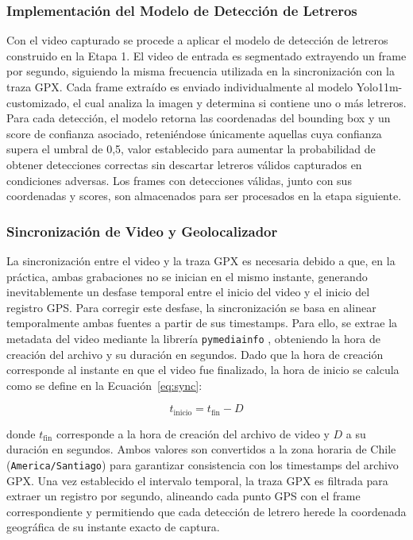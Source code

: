 \documentclass[runningheads]{llncs}
\begin{document}
\subsubsection{Implementación del Modelo de Detección de Letreros}
Con el video capturado se procede a 
aplicar el modelo de detección de letreros construido en la Etapa 1. El 
video de entrada es segmentado extrayendo un frame por segundo, siguiendo la 
misma frecuencia utilizada en la sincronización con la traza GPX. Cada 
frame extraído es enviado individualmente al modelo Yolo11m-customizado, 
el cual analiza la imagen y determina si contiene uno o más letreros. 
Para cada detección, el modelo retorna las coordenadas del bounding box y un score de confianza asociado,
reteniéndose únicamente aquellas cuya confianza supera el umbral de 0{,}5, valor establecido para aumentar la 
probabilidad de obtener detecciones correctas sin descartar letreros válidos capturados en condiciones adversas. 
Los frames con detecciones válidas, junto con sus coordenadas y scores, son 
almacenados para ser procesados en la etapa siguiente.

\subsubsection{Sincronización de Video y Geolocalizador}
La sincronización entre el video y la traza GPX es necesaria debido a 
que, en la práctica, ambas grabaciones no se inician en el mismo 
instante, generando inevitablemente un desfase temporal entre 
el inicio del video y el inicio del registro GPS. Para corregir este 
desfase, la sincronización se basa en alinear temporalmente ambas 
fuentes a partir de sus timestamps. Para ello, se extrae la metadata 
del video mediante la librería \texttt{pymediainfo} \cite{pymediainfo}, 
obteniendo la hora de creación del archivo y su duración en segundos. 
Dado que la hora de creación corresponde al instante en que el video 
fue finalizado, la hora de inicio se calcula como se define en la Ecuación~\ref{eq:sync}:

\begin{equation}
    t_{\text{inicio}} = t_{\text{fin}} - D
    \label{eq:sync}
\end{equation}

\noindent donde $t_{\text{fin}}$ corresponde a la hora de creación del 
archivo de video y $D$ a su duración en segundos. Ambos valores son 
convertidos a la zona horaria de Chile (\texttt{America/Santiago}) para 
garantizar consistencia con los timestamps del archivo GPX. Una vez 
establecido el intervalo temporal, la traza GPX es filtrada para 
extraer un registro por segundo, alineando cada punto GPS con el frame 
correspondiente y permitiendo que cada detección de letrero herede la 
coordenada geográfica de su instante exacto de captura.
\end{document}
